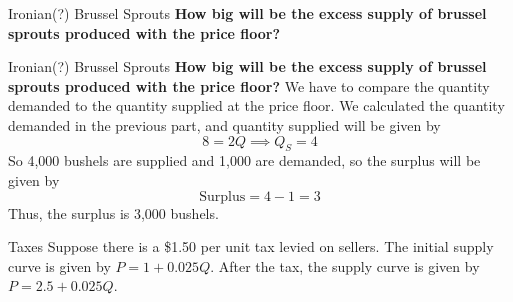 \documentclass{beamer}
\begin{document}
\begin{frame}[t]{Ironian(?) Brussel Sprouts}
    \textbf{How big will be the excess supply of brussel sprouts produced with the price floor?}
\end{frame}

\begin{frame}[t]{Ironian(?) Brussel Sprouts}
    \textbf{How big will be the excess supply of brussel sprouts produced with the price floor?}
    \newline 
    \newline We have to compare the quantity demanded to the quantity supplied at the price floor. We calculated the quantity demanded in the previous part, and quantity supplied will be given by
    \[8 = 2Q \implies \boxed{Q_S = 4}\]
    So 4,000 bushels are supplied and 1,000 are demanded, so the surplus will be given by
    \[\text{Surplus} = 4-1 = 3\]
    Thus, the surplus is 3,000 bushels.
\end{frame}

\begin{frame}{Taxes}
    Suppose there is a \$1.50 per unit tax levied on sellers. The initial supply curve is given by $P=1+0.025Q$. After the tax, the supply curve is given by $P=2.5+0.025Q$.
    \begin{center}
    \end{center}
\end{frame}
\end{document}
